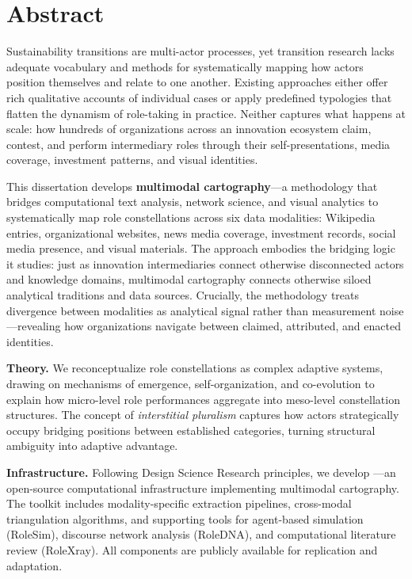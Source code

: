 \documentclass[../main.tex]{subfiles}
\begin{document}
\chapter*{Abstract}

Sustainability transitions are multi-actor processes, yet transition research lacks adequate vocabulary and methods for systematically mapping how actors position themselves and relate to one another. Existing approaches either offer rich qualitative accounts of individual cases or apply predefined typologies that flatten the dynamism of role-taking in practice. Neither captures what happens at scale: how hundreds of organizations across an innovation ecosystem claim, contest, and perform intermediary roles through their self-presentations, media coverage, investment patterns, and visual identities.

This dissertation develops \textbf{multimodal cartography}---a methodology that bridges computational text analysis, network science, and visual analytics to systematically map role constellations across six data modalities: Wikipedia entries, organizational websites, news media coverage, investment records, social media presence, and visual materials. The approach embodies the bridging logic it studies: just as innovation intermediaries connect otherwise disconnected actors and knowledge domains, multimodal cartography connects otherwise siloed analytical traditions and data sources. Crucially, the methodology treats divergence between modalities as analytical signal rather than measurement noise---revealing how organizations navigate between claimed, attributed, and enacted identities.

\textbf{Theory.} We reconceptualize role constellations as complex adaptive systems, drawing on mechanisms of emergence, self-organization, and co-evolution to explain how micro-level role performances aggregate into meso-level constellation structures. The concept of \textit{interstitial pluralism} captures how actors strategically occupy bridging positions between established categories, turning structural ambiguity into adaptive advantage.

\textbf{Infrastructure.} Following Design Science Research principles, we develop \RoleBox---an open-source computational infrastructure implementing multimodal cartography. The toolkit includes modality-specific extraction pipelines, cross-modal triangulation algorithms, and supporting tools for agent-based simulation (RoleSim), discourse network analysis (RoleDNA), and computational literature review (RoleXray). All components are publicly available for replication and adaptation.
\end{document}
